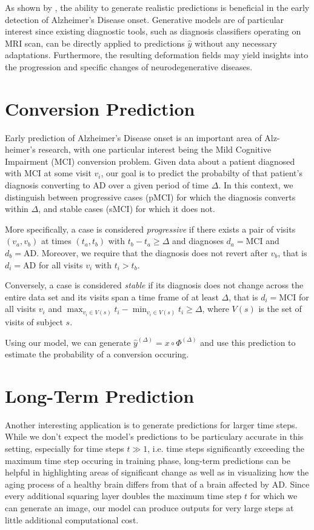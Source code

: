 As shown by \cite{wegmayr2019generative}, the ability to generate realistic predictions is beneficial in the early detection of Alzheimer's Disease onset. Generative models are of particular interest since existing diagnostic tools, such as diagnosis classifiers operating on MRI scan, can be directly applied to predictions $\hat y$ without any necessary adaptations. Furthermore, the resulting deformation fields may yield insights into the progression and specific changes of neurodegenerative diseases.

\section{Conversion Prediction} \label{sec:appconvpred}
Early prediction of Alzheimer's Disease onset is an important area of Alz-heimer's research, with one particular interest being the Mild Cognitive Impairment (MCI) conversion problem. Given data about a patient diagnosed with MCI at some visit $v_i$, our goal is to predict the probabilty of that patient's diagnosis converting to AD over a given period of time $ \Delta $. 
In this context, we distinguish between progressive cases (pMCI) for which the diagnosis converts within $\Delta$, and stable cases (sMCI) for which it does not.

More specifically, a case is considered \textit{progressive} if there exists a pair of visits $(v_a, v_b)$ at times $(t_a, t_b)$ with $ t_b - t_a \geq \Delta $ and diagnoses $d_a = \text{MCI} $ and $d_b = \text{AD} $. Moreover, we require that the diagnosis does not revert after $v_b$, that is $ d_i = \text{AD} $ for all visits $v_i$ with $t_i > t_b$.

Conversely, a case is considered \textit{stable} if its diagnosis does not change across the entire data set and its visits span a time frame of at least $\Delta$, that is $ d_i = \text{MCI} $ for all visits $v_i$ and $ { \max_{v_i \in V(s)} t_i -  \min_{v_i \in V(s)} t_i \geq \Delta } $, where $V(s)$ is the set of visits of subject $s$.

Using our model, we can generate $\hat y^{(\Delta)} = x \circ \Phi^{(\Delta)}$ and use this prediction to estimate the probability of a conversion occuring.

\section{Long-Term Prediction}
\label{sec:applongterm}
Another interesting application is to generate predictions for larger time steps. While we don't expect the model's predictions to be particulary accurate in this setting, especially for time steps $t \gg 1$, i.e. time steps significantly exceeding the maximum time step occuring in training phase, long-term predictions can be helpful in highlighting areas of significant change as well as in visualizing how the aging process of a healthy brain differs from that of a brain affected by AD. Since every additional squaring layer doubles the maximum time step $t$ for which we can generate an image, our model can produce outputs for very large steps at little additional computational cost.

